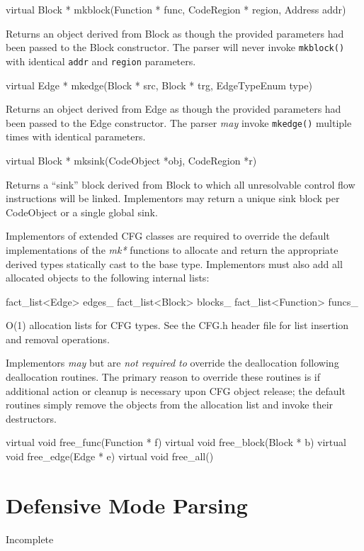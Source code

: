 \documentclass{article}
\newenvironment{apient}{\small\verbatim}{\endverbatim}
\newcommand{\apidesc}[1]{%
{\addtolength{\leftskip}{4em}%
#1\par\medskip}
}
\begin{document}
\begin{apient}
virtual Block * mkblock(Function * func, CodeRegion * region, Address addr)
\end{apient}
\apidesc{Returns an object derived from Block as though the provided parameters had been passed to the Block constructor. The parser will never invoke \texttt{mkblock()} with identical \texttt{addr} and \texttt{region} parameters.}

\begin{apient}
virtual Edge * mkedge(Block * src, Block * trg, EdgeTypeEnum type)
\end{apient}
\apidesc{Returns an object derived from Edge as though the provided parameters had been passed to the Edge constructor. The parser \emph{may} invoke \texttt{mkedge()} multiple times with identical parameters.}

\begin{apient}
virtual Block * mksink(CodeObject *obj, CodeRegion *r)
\end{apient}
\apidesc{Returns a ``sink'' block derived from Block to which all unresolvable control flow instructions will be linked. Implementors may return a unique sink block per CodeObject or a single global sink.}

Implementors of extended CFG classes are required to override the default implementations of the \emph{mk*} functions to allocate and return the appropriate derived types statically cast to the base type. Implementors must also add all allocated objects to the following internal lists:

\begin{apient}
fact_list<Edge> edges_
fact_list<Block> blocks_
fact_list<Function> funcs_
\end{apient}
\apidesc{O(1) allocation lists for CFG types. See the CFG.h header file for list insertion and removal operations.}

Implementors \emph{may} but are \emph{not required to} override the
deallocation following deallocation routines. The primary reason to override
these routines is if additional action or cleanup is necessary upon CFG object
release; the default routines simply remove the objects from the allocation
list and invoke their destructors.

\begin{apient}
virtual void free_func(Function * f)
virtual void free_block(Block * b)
virtual void free_edge(Edge * e)
virtual void free_all()
\end{apient}

\section{Defensive Mode Parsing}

Incomplete
\end{document}
